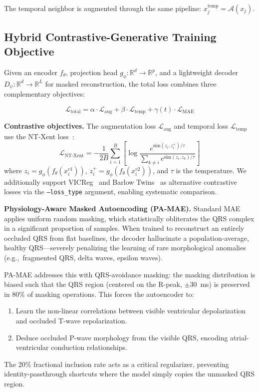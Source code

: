 \documentclass[journal,10pt]{IEEEtran}
\newcommand{\eg}{e.g.,~}
\begin{document}
The temporal neighbor is augmented through the same pipeline: $x_j^{\text{temp}} = \mathcal{A}(x_j)$.

\subsection{Hybrid Contrastive-Generative Training Objective}
\label{sec:training_objective}

Given an encoder $f_\theta$, projection head $g_\phi: \mathbb{R}^d \rightarrow \mathbb{R}^p$, and a lightweight decoder $D_\psi: \mathbb{R}^d \rightarrow \mathbb{R}^L$ for masked reconstruction, the total loss combines three complementary objectives:

\begin{equation}
    \mathcal{L}_{\text{total}} = \alpha \cdot \mathcal{L}_{\text{aug}} + \beta \cdot \mathcal{L}_{\text{temp}} + \gamma(t) \cdot \mathcal{L}_{\text{MAE}}
    \label{eq:total_loss}
\end{equation}

\noindent\textbf{Contrastive objectives.} The augmentation loss $\mathcal{L}_{\text{aug}}$ and temporal loss $\mathcal{L}_{\text{temp}}$ use the NT-Xent loss~\cite{Chen2020SimCLR}:
\begin{equation}
    \mathcal{L}_{\text{NT-Xent}} = -\frac{1}{2B} \sum_{i=1}^{B} \left[\log \frac{e^{\text{sim}(z_i, z_i^+)/\tau}}{\sum_{k \neq i} e^{\text{sim}(z_i, z_k)/\tau}}\right]
\end{equation}
where $z_i = g_\phi(f_\theta(x_i^{v1}))$, $z_i^+ = g_\phi(f_\theta(x_i^{v2}))$, and $\tau$ is the temperature. We additionally support VICReg~\cite{Bardes2022VICReg} and Barlow Twins~\cite{Zbontar2021BarlowTwins} as alternative contrastive losses via the \texttt{--loss\_type} argument, enabling systematic comparison.

\vspace{0.3em}
\noindent\textbf{Physiology-Aware Masked Autoencoding (PA-MAE).} Standard MAE applies uniform random masking, which statistically obliterates the QRS complex in a significant proportion of samples. When trained to reconstruct an entirely occluded QRS from flat baselines, the decoder hallucinate a population-average, healthy QRS—severely penalizing the learning of rare morphological anomalies (\eg fragmented QRS, delta waves, epsilon waves).

PA-MAE addresses this with QRS-avoidance masking: the masking distribution is biased such that the QRS region (centered on the R-peak, $\pm$30~ms) is preserved in 80\% of masking operations. This forces the autoencoder to:
\begin{enumerate}
    \item Learn the non-linear correlations between visible ventricular depolarization and occluded T-wave repolarization.
    \item Deduce occluded P-wave morphology from the visible QRS, encoding atrial-ventricular conduction relationships.
\end{enumerate}
The 20\% fractional inclusion rate acts as a critical regularizer, preventing identity-passthrough shortcuts where the model simply copies the unmasked QRS region.
\end{document}
